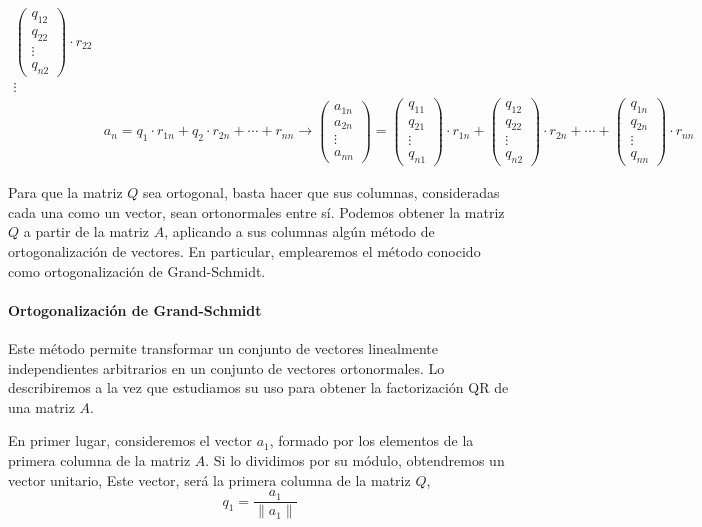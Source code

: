 \begin{align*}
\begin{pmatrix}
q_{12}\\
q_{22}\\
\vdots\\
q_{n2}
\end{pmatrix} \cdot r_{22}\\
\vdots \\
&a_n=q_1\cdot r_{1n}+ q_2\cdot r_{2n}+\cdots +r_{nn} \rightarrow \begin{pmatrix}
a_{1n}\\
a_{2n}\\
\vdots \\
a_{nn}
\end{pmatrix}=\begin{pmatrix}
q_{11}\\
q_{21}\\
\vdots\\
q_{n1}
\end{pmatrix}\cdot r_{1n}+\begin{pmatrix}
q_{12}\\
q_{22}\\
\vdots\\
q_{n2}
\end{pmatrix} \cdot r_{2n}+ \cdots + \begin{pmatrix}
q_{1n}\\
q_{2n}\\
\vdots\\
q_{nn} 
\end{pmatrix}\cdot r_{nn}
\end{align*}

Para que la matriz $Q$ sea ortogonal, basta hacer que sus columnas, consideradas cada una como un vector, sean ortonormales entre sí. Podemos obtener la matriz $Q$ a partir de la matriz $A$, aplicando a sus columnas algún método de ortogonalización de vectores. En particular, emplearemos el método conocido como ortogonalización de Grand-Schmidt.

\paragraph{Ortogonalización de Grand-Schmidt} Este método permite transformar un conjunto de vectores linealmente independientes arbitrarios en un conjunto de vectores ortonormales. Lo describiremos a la vez que estudiamos su uso para obtener la factorización QR de una matriz $A$.

En primer lugar, consideremos el vector $a_1$, formado por los elementos de la primera columna de la matriz $A$. Si lo dividimos por su módulo, obtendremos un vector unitario, Este vector, será la primera columna de la matriz $Q$,
\begin{equation*}
q_1=\frac{a_1}{\lVert a_1 \rVert}
\end{equation*}

